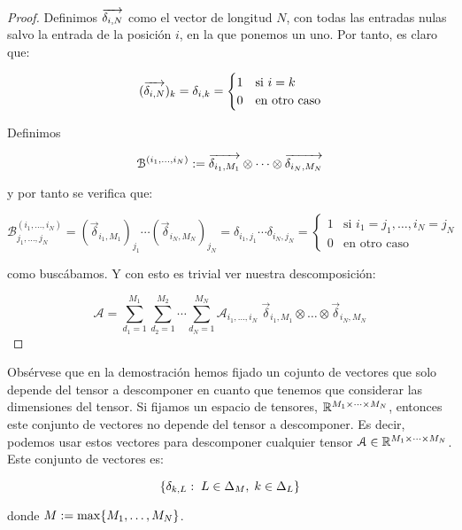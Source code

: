 \begin{proof}
	Definimos $\overrightarrow{\delta_{i, N}}$ como el vector de longitud $N$, con todas las entradas nulas salvo la entrada de la posición $i$, en la que ponemos un uno. Por tanto, es claro que:

	\begin{equation}
		(\overrightarrow{\delta_{i, N}})_k =  \delta_{i, k} =
		\begin{cases}
			1 & \text{si } i = k    \\
			0 & \text{en otro caso}
		\end{cases}
	\end{equation}

	Definimos

	\begin{equation}
		\mathcal{B}^{(i_1, \ldots, i_N)} := \overrightarrow{\delta_{i_1, M_1}} \otimes \cdots \otimes \overrightarrow{\delta_{i_N, M_N}}
	\end{equation}

	y por tanto se verifica que:

	\begin{equation}
		\mathcal{B}^{(i_1, \ldots, i_N)}_{j_1, \ldots, j_N} = (\vec{\delta}_{i_1, M_1})_{j_1} \cdots (\vec{\delta}_{i_N, M_N})_{j_N} = \delta_{i_1, j_1} \cdots \delta_{i_N, j_N} =
		\begin{cases}
			1 & \text{si } i_1 = j_1, \ldots, i_N = j_N \\
			0 & \text{en otro caso}
		\end{cases}
	\end{equation}

	como buscábamos. Y con esto es trivial ver nuestra descomposición:

	\begin{equation}
		\mathcal{A} = \sum_{d_1 = 1}^{M_1} \sum_{d_2 = 1}^{M_2} \cdots \sum_{d_N = 1}^{M_N} \mathcal{A}_{i_1, \ldots, i_N} \; \vec{\delta}_{i_1, M_1} \otimes \ldots \otimes \vec{\delta}_{i_N, M_N}
	\end{equation}
\end{proof}


\begin{observacion} \label{observacion:descomposicion_cp_conjunta}

	Obsérvese que en la demostración hemos fijado un cojunto de vectores que solo depende del tensor a descomponer en cuanto que tenemos que considerar las dimensiones del tensor. Si fijamos un espacio de tensores, $\mathbb{R}^{M_1 \times \cdots \times M_N}$, entonces este conjunto de vectores no depende del tensor a descomponer. Es decir, podemos usar estos vectores para descomponer cualquier tensor $\mathcal{A} \in \mathbb{R}^{M_1 \times \cdots \times M_N}$. Este conjunto de vectores es:

	\begin{equation}
		\{ \delta_{k, L}: \; L \in \Delta_{M}, \; k \in \Delta_{L} \}
	\end{equation}

	donde $M := \max \{ M_1, \ldots, M_N \}$.

\end{observacion}


